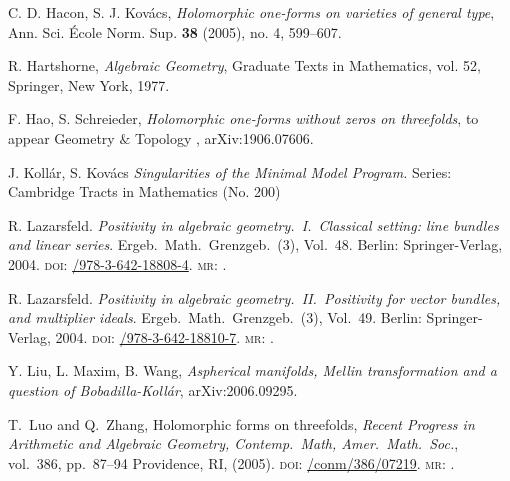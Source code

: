 \documentclass[12pt,reqno]{amsart}
\theoremstyle{question}
\theoremstyle{definition}
\theoremstyle{remark}
\theoremstyle{cited}
\theoremstyle{citeddef}
\begin{document}
\begin{thebibliography}{ADMSP}
 C. D. Hacon, S. J. Kov\'acs, \textit{Holomorphic one-forms on varieties of general type}, Ann. Sci. \'Ecole Norm. Sup. \textbf{38} (2005), no. 4, 599--607.

 R. Hartshorne, \textit{Algebraic Geometry}, Graduate Texts in Mathematics, vol. 52, Springer, New York,
1977.

 F. Hao, S. Schreieder, \textit{Holomorphic one-forms without zeros on threefolds}, to appear Geometry $\&$ Topology , arXiv:1906.07606.

 J. Koll\'ar, S. Kov\'acs {\it Singularities of the Minimal Model Program.}
Series: Cambridge Tracts in Mathematics (No. 200)

    R. Lazarsfeld. \textit{Positivity in algebraic geometry.\ I.\ Classical
    setting: line bundles and linear series}.
    Ergeb.\ Math.\ Grenzgeb.\ (3), Vol.\ 48. Berlin: Springer-Verlag, 2004.
    \textsc{doi}: \href{https://doi.org/10.1007/978-3-642-18808-4}{/978-3-642-18808-4}.
    \textsc{mr}: \href{http://www.ams.org/mathscinet-getitem?mr=2095471}{}.


    R. Lazarsfeld. \textit{Positivity in algebraic geometry.\ II.\ Positivity
    for vector bundles, and multiplier ideals}.
    Ergeb.\ Math.\ Grenzgeb.\ (3), Vol.\ 49. Berlin: Springer-Verlag, 2004.
    \textsc{doi}: \href{https://doi.org/10.1007/978-3-642-18810-7}{/978-3-642-18810-7}.
    \textsc{mr}: \href{http://www.ams.org/mathscinet-getitem?mr=2095472}{}.




 Y. Liu, L. Maxim, B. Wang, \textit{Aspherical manifolds, Mellin transformation and a question of Bobadilla-Koll\'ar}, arXiv:2006.09295.

 T.\ Luo and Q.\ Zhang, Holomorphic forms on threefolds, \textit{Recent Progress in Arithmetic and Algebraic Geometry, Contemp.\ Math, Amer.\ Math.\ Soc.}, vol.\ 386, pp.\ 87--94 Providence, RI, (2005). 
\textsc{doi}: \href{https://doi.org/org/10.1090/conm/386/07219}{/conm/386/07219}.
\textsc{mr}: \href{http://www.ams.org/mathscinet-getitem?mr=2182772}{}.


\end{thebibliography}
\end{document}
